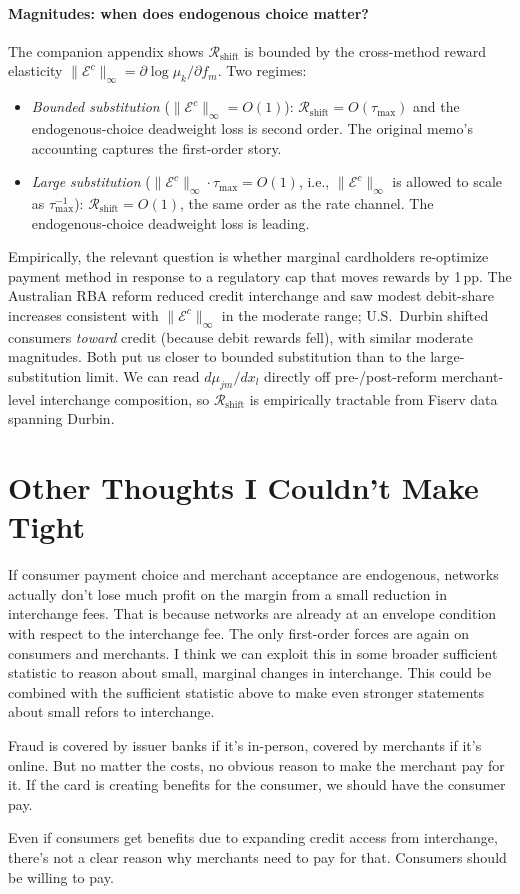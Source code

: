 \documentclass[11pt]{article}
\begin{document}
\paragraph{Magnitudes: when does endogenous choice matter?}
The companion appendix shows $\mathcal{R}_{\text{shift}}$ is bounded by the cross-method reward elasticity $\|\mathcal{E}^c\|_\infty=\partial\log\mu_k/\partial f_m$.
Two regimes:
\begin{itemize}
\item \textit{Bounded substitution} ($\|\mathcal{E}^c\|_\infty=O(1)$): $\mathcal{R}_{\text{shift}}=O(\tau_{\max})$ and the endogenous-choice deadweight loss is second order.
The original memo's accounting captures the first-order story.
\item \textit{Large substitution} ($\|\mathcal{E}^c\|_\infty\cdot\tau_{\max}=O(1)$, i.e., $\|\mathcal{E}^c\|_\infty$ is allowed to scale as $\tau_{\max}^{-1}$): $\mathcal{R}_{\text{shift}}=O(1)$, the same order as the rate channel.
The endogenous-choice deadweight loss is leading.
\end{itemize}
Empirically, the relevant question is whether marginal cardholders re-optimize payment method in response to a regulatory cap that moves rewards by 1\,pp.
The Australian RBA reform reduced credit interchange and saw modest debit-share increases consistent with $\|\mathcal{E}^c\|_\infty$ in the moderate range; U.S.\ Durbin shifted consumers \emph{toward} credit (because debit rewards fell), with similar moderate magnitudes.
Both put us closer to bounded substitution than to the large-substitution limit.
We can read $d\mu_{jm}/dx_l$ directly off pre-/post-reform merchant-level interchange composition, so $\mathcal{R}_{\text{shift}}$ is empirically tractable from Fiserv data spanning Durbin.

\section*{Other Thoughts I Couldn't Make Tight}

If consumer payment choice and merchant acceptance are endogenous, networks actually don't lose much profit on the margin from a small reduction in interchange fees. That is because networks are already at an envelope condition with respect to the interchange fee. 
The only first-order forces are again on consumers and merchants. I think we can exploit this in some broader sufficient statistic to reason about small, marginal changes in interchange. This could be combined with the sufficient statistic above to make even stronger statements about small refors to interchange.

Fraud is covered by issuer banks if it's in-person, covered by merchants if it's online. But no matter the costs, no obvious reason to make the merchant pay for it. If the card is creating benefits for the consumer, we should have the consumer pay.

Even if consumers get benefits due to expanding credit access from interchange, there's not a clear reason why merchants need to pay for that. Consumers should be willing to pay.



\end{document}
